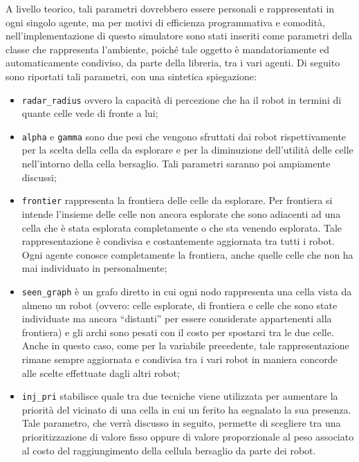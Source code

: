 A livello teorico, tali parametri dovrebbero essere personali e rappresentati in ogni singolo agente, ma per motivi di efficienza programmativa e comodità, nell'implementazione di questo simulatore sono stati inseriti come parametri della classe che rappresenta l'ambiente, poiché tale oggetto è mandatoriamente ed automaticamente condiviso, da parte della libreria, tra i vari agenti.
Di seguito sono riportati tali parametri, con una sintetica spiegazione:
\begin{itemize}
	\item \texttt{radar\_radius} ovvero la capacità di percezione che ha il robot in termini di quante celle vede di fronte a lui;
	\item \texttt{alpha} e \texttt{gamma} sono due pesi che vengono sfruttati dai robot rispettivamente per la scelta della cella da esplorare e per la diminuzione dell'utilità delle celle nell'intorno della cella bersaglio. Tali parametri saranno poi ampiamente discussi;
	\item \texttt{frontier} rappresenta la frontiera delle celle da esplorare. Per frontiera si intende l'insieme delle celle non ancora esplorate che sono adiacenti ad una cella che è stata esplorata completamente o che sta venendo esplorata. Tale rappresentazione è condivisa e costantemente aggiornata tra tutti i robot. Ogni agente conosce completamente la frontiera, anche quelle celle che non ha mai individuato in personalmente;
	\item \texttt{seen\_graph} è un grafo diretto in cui ogni nodo rappresenta una cella vista da almeno un robot (ovvero: celle esplorate, di frontiera e celle che sono state individuate ma ancora “distanti” per essere considerate appartenenti alla frontiera) e gli archi sono pesati con il costo per spostarsi tra le due celle. Anche in questo caso, come per la variabile precedente, tale rappresentazione rimane sempre aggiornata e condivisa tra i vari robot  in maniera concorde alle scelte effettuate dagli altri robot;
	\item \texttt{inj\_pri} stabilisce quale tra due tecniche viene utilizzata per aumentare la priorità del vicinato di una cella in cui un ferito ha segnalato la sua presenza. Tale parametro, che verrà discusso in seguito, permette di scegliere tra una prioritizzazione di valore fisso oppure di valore proporzionale al peso associato al costo del raggiungimento della cellula bersaglio da parte dei robot.
\end{itemize}